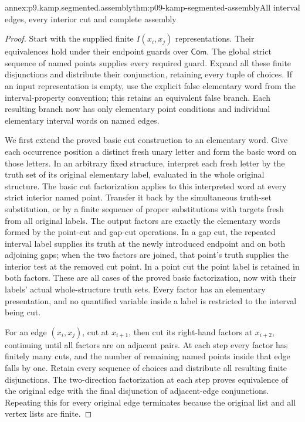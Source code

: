 \begin{annexitem}{annex:p9.kamp.segmented.assembly}{thm:p09-kamp-segmented-assembly}{All interval edges, every interior cut and complete assembly}
\begin{proof}
Start with the supplied finite \(I(x_i,x_j)\) representations.
Their equivalences hold under their endpoint guards over
\(\mathsf{Com}\). The global strict sequence of named points
supplies every required guard. Expand all these finite disjunctions
and distribute their conjunction, retaining every tuple of choices.
If an input representation is empty, use the explicit false elementary
word from the interval-property convention; this retains an equivalent
false branch. Each resulting branch now has only elementary point
conditions and individual elementary interval words on named edges.

We first extend the proved basic cut construction to an elementary
word. Give each occurrence position a distinct fresh unary letter and
form the basic word on those letters. In an arbitrary fixed structure,
interpret each fresh letter by the truth set of its original elementary
label, evaluated in the whole original structure. The basic cut
factorization applies to this interpreted word at every strict interior
named point. Transfer it back by the simultaneous truth-set substitution,
or by a finite sequence of proper substitutions with targets fresh from
all original labels. The output factors are exactly the elementary
words formed by the point-cut and gap-cut operations. In a gap cut,
the repeated interval label supplies its truth at the newly introduced
endpoint and on both adjoining gaps; when the two factors are joined,
that point's truth supplies the interior test at the removed cut point.
In a point cut the point label is retained in both factors. These are
all cases of the proved basic factorization, now with their labels'
actual whole-structure truth sets. Every factor has an elementary
presentation, and no quantified variable inside a label is restricted
to the interval being cut.

For an edge \((x_i,x_j)\), cut at \(x_{i+1}\), then cut
its right-hand factors at \(x_{i+2}\), continuing until all
factors are on adjacent pairs. At each step every factor has finitely
many cuts, and the number of remaining named points inside that edge
falls by one. Retain every sequence of choices and distribute all
resulting finite disjunctions. The two-direction factorization at each
step proves equivalence of the original edge with the final disjunction
of adjacent-edge conjunctions. Repeating this for every original edge
terminates because the original list and all vertex lists are finite.


\end{proof}
\end{annexitem}
